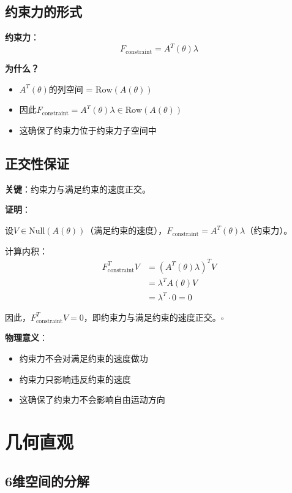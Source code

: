 \documentclass[12pt,a4paper]{article}
\begin{document}
\subsection{约束力的形式}

\textbf{约束力}：
\begin{equation}
F_{\text{constraint}} = A^T(\theta)\lambda
\end{equation}

\textbf{为什么？}
\begin{itemize}
\item $A^T(\theta)$的列空间 = $\text{Row}(A(\theta))$
\item 因此$F_{\text{constraint}} = A^T(\theta)\lambda \in \text{Row}(A(\theta))$
\item 这确保了约束力位于约束力子空间中
\end{itemize}

\subsection{正交性保证}

\textbf{关键}：约束力与满足约束的速度正交。

\textbf{证明}：

设$V \in \text{Null}(A(\theta))$（满足约束的速度），$F_{\text{constraint}} = A^T(\theta)\lambda$（约束力）。

计算内积：
\begin{align}
F_{\text{constraint}}^T V &= (A^T(\theta)\lambda)^T V \\
&= \lambda^T A(\theta) V \\
&= \lambda^T \cdot 0 = 0
\end{align}

因此，$F_{\text{constraint}}^T V = 0$，即约束力与满足约束的速度正交。$\square$

\textbf{物理意义}：
\begin{itemize}
\item 约束力不会对满足约束的速度做功
\item 约束力只影响违反约束的速度
\item 这确保了约束力不会影响自由运动方向
\end{itemize}

\section{几何直观}

\subsection{6维空间的分解}
\end{document}
